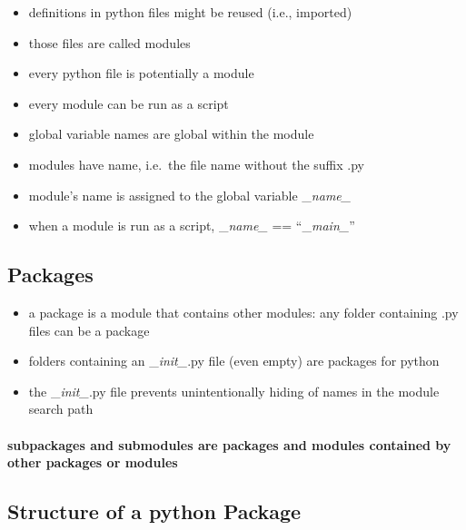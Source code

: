 \documentclass[11pt]{article}
\providecommand{\tightlist}{%
      \setlength{\itemsep}{0pt}\setlength{\parskip}{0pt}}
\begin{document}
\begin{itemize}
\tightlist
\item
  definitions in python files might be reused (i.e., imported)
\item
  those files are called modules
\item
  every python file is potentially a module
\item
  every module can be run as a script
\item
  global variable names are global within the module
\item
  modules have name, i.e.~the file name without the suffix .py
\item
  module's name is assigned to the global variable \_\emph{name\_}
\item
  when a module is run as a script, \_\emph{name\_} ==
  ``\_\emph{main\_}''
\end{itemize}

\hypertarget{packages}{%
\subsection{Packages}\label{packages}}

\begin{itemize}
\tightlist
\item
  a package is a module that contains other modules: any folder
  containing .py files can be a package
\item
  folders containing an \_\emph{init\_}.py file (even empty) are
  packages for python
\item
  the \_\emph{init\_}.py file prevents unintentionally hiding of names
  in the module search path
\end{itemize}

\hypertarget{subpackages-and-submodules-are-packages-and-modules-contained-by-other-packages-or-modules}{%
\paragraph{subpackages and submodules are packages and modules contained
by other packages or
modules}\label{subpackages-and-submodules-are-packages-and-modules-contained-by-other-packages-or-modules}}

    \hypertarget{structure-of-a-python-package}{%
\subsection{Structure of a python
Package}\label{structure-of-a-python-package}}
\end{document}

